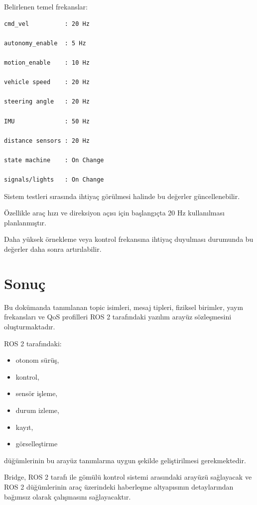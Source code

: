 \documentclass[12pt,a4paper]{article}
\begin{document}
Belirlenen temel frekanslar:

\begin{verbatim}
cmd_vel          : 20 Hz

autonomy_enable  : 5 Hz

motion_enable    : 10 Hz

vehicle speed    : 20 Hz

steering angle   : 20 Hz

IMU              : 50 Hz

distance sensors : 20 Hz

state machine    : On Change

signals/lights   : On Change
\end{verbatim}

Sistem testleri sırasında ihtiyaç görülmesi halinde bu değerler
güncellenebilir.

Özellikle araç hızı ve direksiyon açısı için başlangıçta 20 Hz
kullanılması planlanmıştır.

Daha yüksek örnekleme veya kontrol frekansına ihtiyaç duyulması durumunda
bu değerler daha sonra artırılabilir.

\section{Sonuç}

Bu dokümanda tanımlanan topic isimleri, mesaj tipleri, fiziksel birimler,
yayın frekansları ve QoS profilleri ROS 2 tarafındaki yazılım arayüz
sözleşmesini oluşturmaktadır.

ROS 2 tarafındaki:

\begin{itemize}

    \item otonom sürüş,

    \item kontrol,

    \item sensör işleme,

    \item durum izleme,

    \item kayıt,

    \item görselleştirme

\end{itemize}

düğümlerinin bu arayüz tanımlarına uygun şekilde geliştirilmesi
gerekmektedir.

Bridge, ROS 2 tarafı ile gömülü kontrol sistemi arasındaki arayüzü
sağlayacak ve ROS 2 düğümlerinin araç üzerindeki haberleşme altyapısının
detaylarından bağımsız olarak çalışmasını sağlayacaktır.

\end{document}
